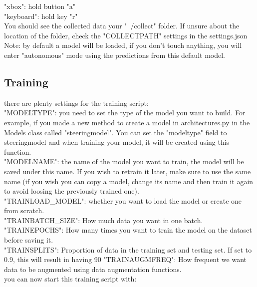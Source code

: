 \documentclass[12pt]{article}
\begin{document}
"xbox": hold button "a"\\
"keyboard": hold key "r"\\
You should see the collected data your "~/collect" folder. If unsure about the location of the folder, check the "COLLECT\textunderscore PATH" settings in the settings.json\\

Note: by default a model will be loaded, if you don't touch anything, you will enter "autonomous" mode using the predictions from this default model.\\


\subsection{Training}
there are plenty settings for the training script:\\
"MODEL\textunderscore TYPE": you need to set the type of the model you want to build. For example, if you made a new method to create a model in architectures.py in the Models class called "steering\textunderscore model". You can set the "model\textunderscore type" field to steering\textunderscore model and when training your model, it will be created using this function.\\
"MODEL\textunderscore NAME": the name of the model you want to train, the model will be saved under this name. If you wish to retrain it later, make sure to use the same name (if you wish you can copy a model, change its name and then train it again to avoid loosing the previously trained one).\\
"TRAIN\textunderscore LOAD_MODEL": whether you want to load the model or create one from scratch.\\
"TRAIN\textunderscore BATCH_SIZE": How much data you want in one batch.\\
"TRAIN\textunderscore EPOCHS": How many times you want to train the model on the dataset before saving it.\\
"TRAIN\textunderscore SPLITS": Proportion of data in the training set and testing set. If set to 0.9, this will result in having 90%
"TRAIN\textunderscore AUGM\textunderscore FREQ": How frequent we want data to be augmented using data augmentation functions.\\


you can now start this training script with:\\
\noindent{}\\
\end{document}
